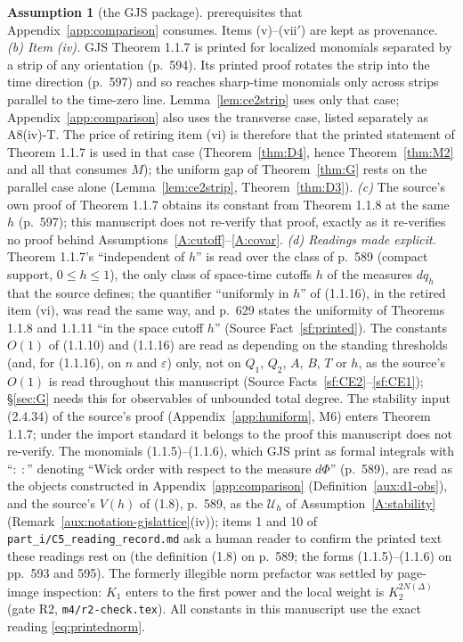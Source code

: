 \documentclass[11pt,a4paper]{article}
\theoremstyle{plain}
\theoremstyle{definition}
\newtheorem{assumption}{Assumption}
\theoremstyle{plain}
\theoremstyle{definition}
\begin{document}
\begin{assumption}[the GJS package]
prerequisites that Appendix~\ref{app:comparison} consumes.  Items (v)--(vii$'$) are kept
as provenance.
\emph{(b) Item (iv).}  GJS Theorem 1.1.7 is printed for localized monomials separated by a
strip of any orientation (p.~594).  Its printed proof rotates the strip into the time
direction (p.~597) and so reaches sharp-time monomials only across strips parallel to the
time-zero line.  Lemma~\ref{lem:ce2strip} uses only that case; Appendix~\ref{app:comparison}
also uses the transverse case, listed separately as A8(iv)-T.  The price of retiring
item (vi) is therefore that the printed statement of Theorem 1.1.7 is used in that case
(Theorem~\ref{thm:D4}, hence Theorem~\ref{thm:M2} and all that consumes $M$); the uniform gap
of Theorem~\ref{thm:G} rests on the parallel case alone (Lemma~\ref{lem:ce2strip},
Theorem~\ref{thm:D3}).
\emph{(c)} The source's own proof of Theorem 1.1.7 obtains its constant from Theorem 1.1.8
at the same $h$ (p.~597); this manuscript does not re-verify that proof, exactly as it
re-verifies no proof behind Assumptions~\ref{A:cutoff}--\ref{A:covar}.
\emph{(d) Readings made explicit.}  Theorem 1.1.7's ``independent of $h$'' is read over
the class of p.~589 (compact support, $0\le h\le1$), the only class of space-time cutoffs
$h$ of the measures $dq_h$ that the source defines; the quantifier ``uniformly in $h$'' of
(1.1.16), in the retired item (vi), was read the same way, and p.~629 states the
uniformity of Theorems 1.1.8 and 1.1.11 ``in the space cutoff $h$''
(Source Fact~\ref{sf:printed}).  The constants $O(1)$ of (1.1.10) and (1.1.16) are read as
depending on the standing thresholds (and, for (1.1.16), on $n$ and $\varepsilon$) only,
not on $Q_1$, $Q_2$, $A$, $B$, $T$ or $h$, as the source's $O(1)$ is read throughout this
manuscript (Source Facts~\ref{sf:CE2}--\ref{sf:CE1}); \S\ref{sec:G} needs this for
observables of unbounded total degree.  The stability input (2.4.34) of the source's proof
(Appendix~\ref{app:huniform}, M6) enters Theorem 1.1.7; under the import standard it
belongs to the proof this manuscript does not re-verify.  The monomials (1.1.5)--(1.1.6),
which GJS print as formal integrals with ``${:}\ {:}$'' denoting ``Wick order with respect
to the measure $d\Phi$'' (p.~589), are read as the objects constructed in
Appendix~\ref{app:comparison} (Definition~\ref{aux:d1-obs}), and the source's $V(h)$ of
(1.8), p.~589, as the $\mathcal U_h$ of Assumption~\ref{A:stability}
(Remark~\ref{aux:notation-gjslattice}(iv)); items 1 and 10 of \texttt{part\_i/C5\_reading\_record.md}
ask a human reader to confirm the printed text these readings rest on (the definition (1.8) on
p.~589; the forms (1.1.5)--(1.1.6) on pp.~593 and 595).  The formerly
illegible norm prefactor was settled by page-image inspection: $K_1$ enters to the first
power and the local weight is $K_2^{2N(\Delta)}$ (gate R2, \texttt{m4/r2-check.tex}).  All
constants in this manuscript use the exact reading \eqref{eq:printednorm}.


\end{assumption}
\end{document}
